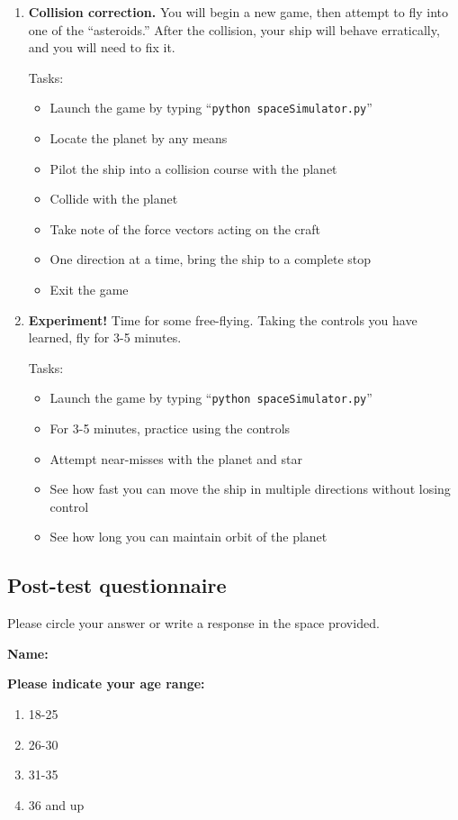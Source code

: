 \begin{enumerate}
  \item \textbf{Collision correction.}  You will begin a new game, then attempt to fly into one of the ``asteroids.''  After the collision, your ship will behave erratically, and you will need to fix it.
  
  Tasks:
  \begin{itemize}
    \item Launch the game by typing ``\texttt{python spaceSimulator.py}''
    \item Locate the planet by any means
    \item Pilot the ship into a collision course with the planet
    \item Collide with the planet
    \item Take note of the force vectors acting on the craft
    \item One direction at a time, bring the ship to a complete stop
    \item Exit the game
  \end{itemize}
  
  \item \textbf{Experiment!}  Time for some free-flying.  Taking the controls you have learned, fly for 3-5 minutes. 
  
  Tasks:
  \begin{itemize}
    \item Launch the game by typing ``\texttt{python spaceSimulator.py}''
    \item For 3-5 minutes, practice using the controls
    \item Attempt near-misses with the planet and star
    \item See how fast you can move the ship in multiple directions without losing control
    \item See how long you can maintain orbit of the planet
  \end{itemize}

\end{enumerate}

\subsection{Post-test questionnaire}

Please circle your answer or write a response in the space provided.

\vspace{5mm}
\noindent\textbf{Name:}

\vspace{5mm}
\noindent\textbf{Please indicate your age range:}
\begin{enumerate}
  \item 18-25
  \item 26-30
  \item 31-35
  \item 36 and up
\end{enumerate}

